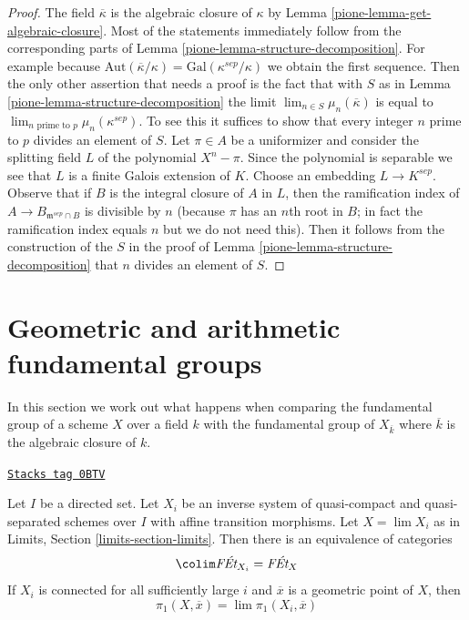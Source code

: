 \begin{proof}

The field $\overline{\kappa}$ is the algebraic closure of $\kappa$ by
Lemma \ref{pione-lemma-get-algebraic-closure}.
Most of the statements immediately follow from the corresponding
parts of Lemma \ref{pione-lemma-structure-decomposition}. For example because
$\text{Aut}(\overline{\kappa}/\kappa) = \text{Gal}(\kappa^{sep}/\kappa)$
we obtain the first sequence.
Then the only other assertion that needs a proof is the fact that
with $S$ as in Lemma \ref{pione-lemma-structure-decomposition} the
limit $\lim_{n \in S} \mu_n(\overline{\kappa})$ is equal to
$\lim_{n\text{ prime to }p} \mu_n(\kappa^{sep})$. To see this
it suffices to show that every integer $n$ prime to $p$
divides an element of $S$.
Let $\pi \in A$ be a uniformizer and consider the splitting
field $L$ of the polynomial $X^n - \pi$. Since the polynomial
is separable we see that $L$ is a finite Galois extension of $K$.
Choose an embedding $L \to K^{sep}$.
Observe that if $B$ is the integral closure of $A$ in $L$,
then the ramification index of $A \to B_{\mathfrak m^{sep} \cap B}$
is divisible by $n$ (because $\pi$ has an $n$th root in $B$; in fact
the ramification index equals $n$ but we do not need this).
Then it follows from the construction of the $S$ in the proof of
Lemma \ref{pione-lemma-structure-decomposition}
that $n$ divides an element of $S$.
\end{proof}

\section{Geometric and arithmetic fundamental groups}
\label{pione-section-galois-action}
In this section we work out what happens when comparing the
fundamental group of a scheme $X$ over a field $k$ with the
fundamental group of $X_{\overline{k}}$ where $\overline{k}$
is the algebraic closure of $k$.

\begin{lemma}[Limit]
\label{pione-lemma-limit}
\href{https://stacks.math.columbia.edu/tag/0BTV}{\texttt{Stacks tag 0BTV}}

Let $I$ be a directed set. Let $X_i$ be an
inverse system of quasi-compact and quasi-separated schemes
over $I$ with affine transition morphisms.
Let $X = \lim X_i$ as in Limits, Section \ref{limits-section-limits}.
Then there is an equivalence of categories
$$
\colim \textit{F\'Et}_{X_i} = \textit{F\'Et}_X
$$
If $X_i$ is connected for all sufficiently large $i$ and $\overline{x}$
is a geometric point of $X$, then
$$
\pi_1(X, \overline{x}) = \lim \pi_1(X_i, \overline{x})
$$
\end{lemma}


